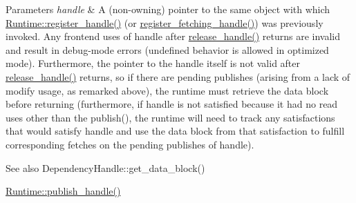 \begin{DoxyParams}{Parameters}
{\em handle} & A (non-\/owning) pointer to the same object with which \hyperlink{classdarma__runtime_1_1abstract_1_1backend_1_1_runtime_a8c70dc2b90fedd7ae6f090a19b3f694f}{Runtime\+::register\+\_\+handle()} (or \hyperlink{classdarma__runtime_1_1abstract_1_1backend_1_1_runtime_acdb81206fe8a663754cf68f44731b35e}{register\+\_\+fetching\+\_\+handle()}) was previously invoked. Any frontend uses of {\ttfamily handle} after \hyperlink{classdarma__runtime_1_1abstract_1_1backend_1_1_runtime_a54ba21615ed22638ea23a2a1f03fea02}{release\+\_\+handle()} returns are invalid and result in debug-\/mode errors (undefined behavior is allowed in optimized mode). Furthermore, the pointer to the handle itself is not valid after \hyperlink{classdarma__runtime_1_1abstract_1_1backend_1_1_runtime_a54ba21615ed22638ea23a2a1f03fea02}{release\+\_\+handle()} returns, so if there are pending publishes (arising from a lack of modify usage, as remarked above), the runtime must retrieve the data block before returning (furthermore, if handle is not satisfied because it had no read uses other than the publish(), the runtime will need to track any satisfactions that would satisfy handle and use the data block from that satisfaction to fulfill corresponding fetches on the pending publishes of handle).\\
\hline
\end{DoxyParams}
\begin{DoxySeeAlso}{See also}
Dependency\+Handle\+::get\+\_\+data\+\_\+block() 

\hyperlink{classdarma__runtime_1_1abstract_1_1backend_1_1_runtime_a99e798d2c6d6ed6e49e68d3136764cde}{Runtime\+::publish\+\_\+handle()} 
\end{DoxySeeAlso}
